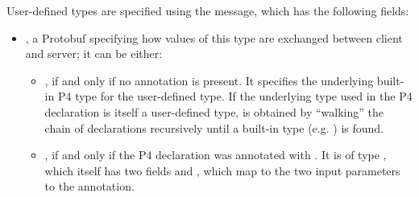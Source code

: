 \documentclass[11pt]{article}
\begin{document}
{%
User-defined types are specified using the  message, which has
the following fields:%

\begin{itemize}%

\item{}
, a Protobuf  specifying how values of this type are
exchanged between client and server; it can be either:%

\begin{itemize}%

\item{}
, if and only if no  annotation is
present. It specifies the underlying built-in P4 type for the user-defined
type. If the underlying type used in the P4  declaration is itself a
user-defined type,  is obtained by \textquotedblleft{}walking\textquotedblright{} the chain of
 declarations recursively until a built-in type (e.g. ) is
found.%

\item{}
, if and only if the P4  declaration was annotated
with . It is of type , which
itself has two fields \textemdash{}  and  \textemdash{}, which map to the
two input parameters to the annotation.%
\end{itemize}%


\end{itemize}}
\end{document}
